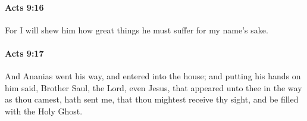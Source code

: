		\paragraph{Acts 9:16} %
			\label{ACTS-9-16}

			For I will shew him how great things he must suffer for my name's sake.

			\begin{framed}
			\scriptsize
				\begin{compactdesc}
					\item[SBLG] 
				\end{compactdesc}
			\end{framed}

		\paragraph{Acts 9:17} %
			\label{ACTS-9-17}

			And Ananias went his way, and entered into the house; and putting his hands on him said, Brother Saul, the Lord, even Jesus, that appeared unto thee in the way as thou camest, hath sent me, that thou mightest receive thy sight, and be filled with the Holy Ghost.

